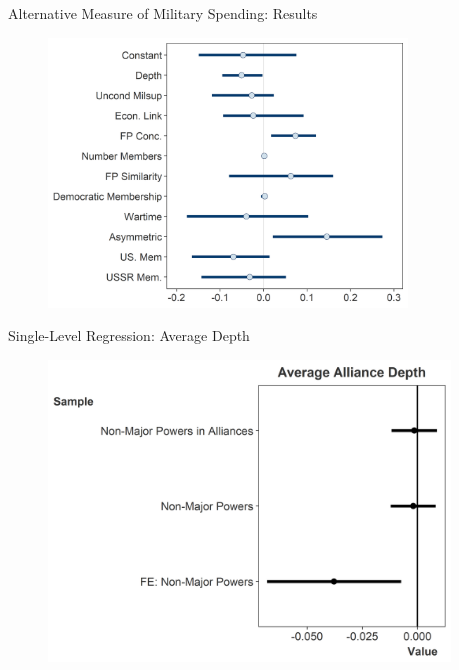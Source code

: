 \documentclass[12pt]{beamer}
\begin{document}

\begin{frame}{Alternative Measure of Military Spending: Results}

\begin{figure}[htbp]
	\centering
		\includegraphics[width=0.85\textwidth]{beta-intervals-post45.png}
\end{figure}

\end{frame}



\begin{frame}{Single-Level Regression: Average Depth}


\begin{figure}[htbp]
	\centering
		\includegraphics[width=0.95\textwidth]{single-level-average.png}
\end{figure}


\end{frame}
\end{document}
